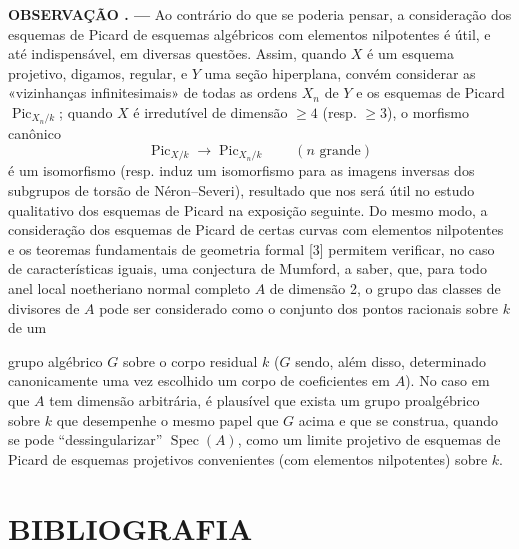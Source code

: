 \documentclass[11pt,twoside,openany]{book}
\numberwithin{equation}{section}
\newcommand{\src}[1]{%
  \phantomsection\hypertarget{src:#1}{}%
  \marginpar{\raggedleft\footnotesize\sffamily #1}%
}
\theoremstyle{plain}
\theoremstyle{definition}
\theoremstyle{remark}
\newcommand{\result}[2]{%
  \par\medskip\noindent\textbf{#1%
  \if\relax\detokenize{#2}\relax\else\space#2\fi. ---}\enspace
}
\newcommand{\FgaUnitKey}{frontmatter}
\renewcommand{\src}[1]{%
  \phantomsection\hypertarget{src:\FgaUnitKey:#1}{}%
  \marginpar{\raggedleft\footnotesize\sffamily #1}%
}
\begin{document}
\result{OBSERVAÇÃO}{6.8} Ao contrário do que se poderia pensar, a consideração
dos esquemas de Picard de esquemas algébricos com elementos nilpotentes é útil,
e até indispensável, em diversas questões. Assim, quando $X$ é um esquema
projetivo, digamos, regular, e $Y$ uma seção hiperplana, convém
considerar as «vizinhanças infinitesimais» de todas as ordens $X_n$ de $Y$ e os
esquemas de Picard $\operatorname{Pic}_{X_n/k}$; quando $X$ é irredutível de
dimensão $\geq4$ (resp. $\geq3$), o morfismo canônico
\[
\operatorname{Pic}_{X/k}\longrightarrow\operatorname{Pic}_{X_n/k}
\qquad(n\text{ grande})
\]
é um isomorfismo (resp. induz um isomorfismo para as imagens inversas dos
subgrupos de torsão de Néron--Severi), resultado que nos será útil no estudo
qualitativo dos esquemas de Picard na exposição seguinte. Do mesmo modo, a
consideração dos esquemas de Picard de certas curvas com elementos nilpotentes
e os teoremas fundamentais de geometria formal [3] permitem verificar, no caso
de características iguais, uma conjectura de Mumford, a saber, que, para todo
anel local noetheriano normal completo $A$ de dimensão 2, o grupo das classes
de divisores de $A$ pode ser considerado como o conjunto dos pontos racionais
sobre $k$ de um
\src{161}
grupo algébrico $G$ sobre o corpo residual $k$ ($G$ sendo, além disso,
determinado canonicamente uma vez escolhido um corpo de coeficientes em $A$).
No caso em que $A$ tem dimensão arbitrária, é plausível que exista um grupo
proalgébrico sobre $k$ que desempenhe o mesmo papel que $G$ acima e que se
construa, quando se pode ``dessingularizar'' $\operatorname{Spec}(A)$, como um
limite projetivo de esquemas de Picard de esquemas projetivos convenientes (com
elementos nilpotentes) sobre $k$.

\section*{BIBLIOGRAFIA}
\end{document}
